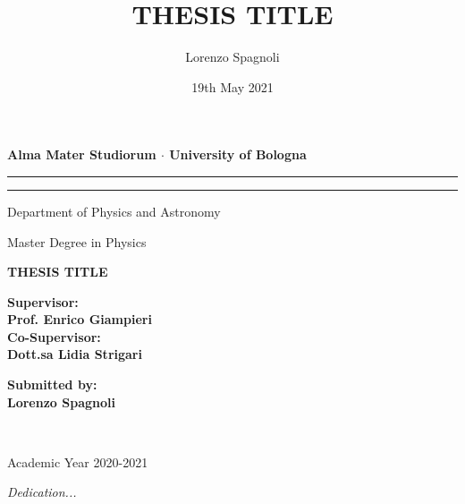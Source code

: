 \documentclass[12pt,a4paper]{report}
\theoremstyle{definition}
\theoremstyle{remark}
\begin{document}
\title{THESIS TITLE}
\author{Lorenzo Spagnoli}
\date{19th May 2021}

\begin{titlepage}
    \begin{center}
        \vspace*{0.2cm}
        {\fontsize{19pt}{20pt}\selectfont \textbf{Alma Mater Studiorum $\cdot$ University of Bologna}\par}
    
        \par\noindent\rule{\textwidth}{.5pt}
        \rule[.5\baselineskip]{\textwidth}{1.5pt}
        \vspace{0.8cm}
        
        \normalfont
        
        Department of Physics and Astronomy
        
        Master Degree in Physics
        
        \Large
        \vspace{5cm}
        {\fontsize{22.5pt}{22.5}\textcolor{MyDarkRed}{\textbf{THESIS TITLE}}}

        
        \vspace{4.5cm}
        \begin{minipage}[t]{0.64\textwidth}
        \begin{flushleft}
        {\fontsize{16pt}{16pt}\textbf{Supervisor:} \\ \textbf{\textcolor{MyDarkRed}{Prof. Enrico Giampieri}}} \\
        {\fontsize{16pt}{16pt}\textbf{Co-Supervisor:} \\ \textbf{\textcolor{MyDarkRed}{Dott.sa Lidia Strigari}}} 
        \end{flushleft}
        \end{minipage}
        \begin{minipage}[t]{0.34\textwidth}
        \begin{flushright} \Large
        \textbf{Submitted by:} \\
        \textbf{\textcolor{MyDarkRed}{Lorenzo Spagnoli}} \\
        \end{flushright}
        \end{minipage}\\
        
        \vfill
        \vspace{0.3cm}
        \small
        
        Academic Year {\textcolor{MyDarkRed} {2020-2021}}
    \end{center}
\end{titlepage}
\restoregeometry
\vspace*{5cm}
\begin{flushright}
  {\parbox{4.2cm}{\textit{Dedication...}}}
\end{flushright}
\end{document}
